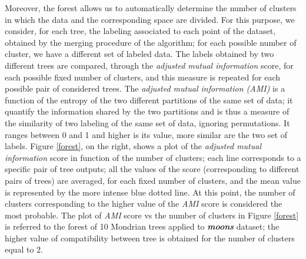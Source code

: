 \documentclass[a4paper]{article}
\begin{document}
Moreover, the forest allows us to automatically determine the number of clusters in which the data and the corresponding space are divided.
For this purpose, we consider, for each tree, the labeling associated to each point of the dataset, obtained by the merging procedure of the algorithm;
for each possible number of cluster, we have a different set of labeled data.
The labels obtained by two different trees are compared, through the \emph{adjusted mutual information} score, for each possible fixed number of clusters, and this measure is repeated for each possible pair of considered trees.
The \emph{adjusted mutual information (AMI)} \cite{scikit-learn} is a function of the entropy of the two different partitions of the same set of data;
it quantify the information shared by the two partitions and is thus a measure of the similarity of two labeling of the same set of data, ignoring permutations.
It ranges between 0 and 1 and higher is its value, more similar are the two set of labels.
Figure \ref{forest}, on the right, shows a plot of the \emph{adjusted mutual information} score in function of the number of clusters;
each line corresponds to a specific pair of tree outputs;
all the values of the score (corresponding to different pairs of trees) are averaged, for each fixed number of clusters, and the mean value is represented by the more intense blue dotted line.
At this point, the number of clusters corresponding to the higher value of the \emph{AMI} score is considered the most probable.
The plot of \emph{AMI} score vs the number of clusters in Figure \ref{forest} is referred to the forest of 10 Mondrian trees applied to \emph{\textbf{moons}} dataset;
the higher value of compatibility between tree is obtained for the number of clusters equal to 2.
\end{document}
